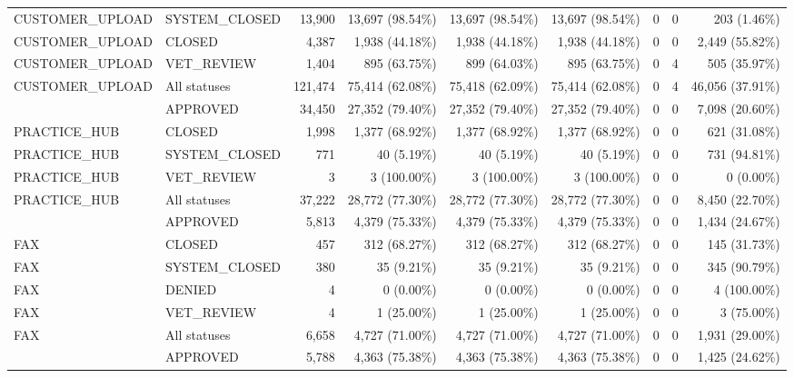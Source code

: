 \begin{longtable}{@{}llrrrrrrr@{}}
{CUSTOMER\_UPLOAD} & {SYSTEM\_CLOSED} & 13,900 & 13,697 (98.54\%) & 13,697 (98.54\%) & 13,697 (98.54\%) & 0 & 0 & 203 (1.46\%) \\

{CUSTOMER\_UPLOAD} & {CLOSED} & 4,387 & 1,938 (44.18\%) & 1,938 (44.18\%) & 1,938 (44.18\%) & 0 & 0 & 2,449 (55.82\%) \\

{CUSTOMER\_UPLOAD} & {VET\_REVIEW} & 1,404 & 895 (63.75\%) & 899 (64.03\%) & 895 (63.75\%) & 0 & 4 & 505 (35.97\%) \\
\midrule
{CUSTOMER\_UPLOAD} & {All statuses} & 121,474 & 75,414 (62.08\%) & 75,418 (62.09\%) & 75,414 (62.08\%) & 0 & 4 & 46,056 (37.91\%) \\
\addlinespace[2pt]
{PRACTICE\_HUB} & {APPROVED} & 34,450 & 27,352 (79.40\%) & 27,352 (79.40\%) & 27,352 (79.40\%) & 0 & 0 & 7,098 (20.60\%) \\

{PRACTICE\_HUB} & {CLOSED} & 1,998 & 1,377 (68.92\%) & 1,377 (68.92\%) & 1,377 (68.92\%) & 0 & 0 & 621 (31.08\%) \\

{PRACTICE\_HUB} & {SYSTEM\_CLOSED} & 771 & 40 (5.19\%) & 40 (5.19\%) & 40 (5.19\%) & 0 & 0 & 731 (94.81\%) \\

{PRACTICE\_HUB} & {VET\_REVIEW} & 3 & 3 (100.00\%) & 3 (100.00\%) & 3 (100.00\%) & 0 & 0 & 0 (0.00\%) \\
\midrule
{PRACTICE\_HUB} & {All statuses} & 37,222 & 28,772 (77.30\%) & 28,772 (77.30\%) & 28,772 (77.30\%) & 0 & 0 & 8,450 (22.70\%) \\
\addlinespace[2pt]
{FAX} & {APPROVED} & 5,813 & 4,379 (75.33\%) & 4,379 (75.33\%) & 4,379 (75.33\%) & 0 & 0 & 1,434 (24.67\%) \\

{FAX} & {CLOSED} & 457 & 312 (68.27\%) & 312 (68.27\%) & 312 (68.27\%) & 0 & 0 & 145 (31.73\%) \\

{FAX} & {SYSTEM\_CLOSED} & 380 & 35 (9.21\%) & 35 (9.21\%) & 35 (9.21\%) & 0 & 0 & 345 (90.79\%) \\

{FAX} & {DENIED} & 4 & 0 (0.00\%) & 0 (0.00\%) & 0 (0.00\%) & 0 & 0 & 4 (100.00\%) \\

{FAX} & {VET\_REVIEW} & 4 & 1 (25.00\%) & 1 (25.00\%) & 1 (25.00\%) & 0 & 0 & 3 (75.00\%) \\
\midrule
{FAX} & {All statuses} & 6,658 & 4,727 (71.00\%) & 4,727 (71.00\%) & 4,727 (71.00\%) & 0 & 0 & 1,931 (29.00\%) \\
\addlinespace[2pt]
{CLINIC\_EMAIL} & {APPROVED} & 5,788 & 4,363 (75.38\%) & 4,363 (75.38\%) & 4,363 (75.38\%) & 0 & 0 & 1,425 (24.62\%) \\


\end{longtable}
